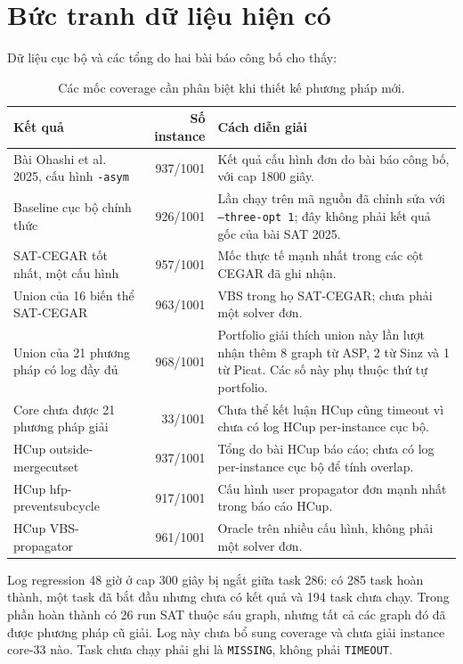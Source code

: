 \documentclass[11pt,a4paper,oneside]{scrreprt}
\newcommand{\code}[1]{\texttt{#1}}
\begin{document}
\section{Bức tranh dữ liệu hiện có}

Dữ liệu cục bộ và các tổng do hai bài báo công bố cho thấy:

\begin{table}[H]
\centering
\begin{tabularx}{\textwidth}{X r X}
\toprule
Kết quả & Số instance & Cách diễn giải \\
\midrule
Bài Ohashi et al. 2025, cấu hình \code{-asym} & 937/1001 & Kết quả cấu hình đơn do bài báo công bố, với cap 1800 giây. \\
Baseline cục bộ chính thức & 926/1001 & Lần chạy trên mã nguồn đã chỉnh sửa với \code{--three-opt 1}; đây không phải kết quả gốc của bài SAT 2025. \\
SAT-CEGAR tốt nhất, một cấu hình & 957/1001 & Mốc thực tế mạnh nhất trong các cột CEGAR đã ghi nhận. \\
Union của 16 biến thể SAT-CEGAR & 963/1001 & VBS trong họ SAT-CEGAR; chưa phải một solver đơn. \\
Union của 21 phương pháp có log đầy đủ & 968/1001 & Portfolio giải thích union này lần lượt nhận thêm 8 graph từ ASP, 2 từ Sinz và 1 từ Picat. Các số này phụ thuộc thứ tự portfolio. \\
Core chưa được 21 phương pháp giải & 33/1001 & Chưa thể kết luận HCup cũng timeout vì chưa có log HCup per-instance cục bộ. \\
HCup outside-mergecutset & 937/1001 & Tổng do bài HCup báo cáo; chưa có log per-instance cục bộ để tính overlap. \\
HCup hfp-preventsubcycle & 917/1001 & Cấu hình user propagator đơn mạnh nhất trong báo cáo HCup. \\
HCup VBS-propagator & 961/1001 & Oracle trên nhiều cấu hình, không phải một solver đơn. \\
\bottomrule
\end{tabularx}
\caption{Các mốc coverage cần phân biệt khi thiết kế phương pháp mới.}
\end{table}

Log regression 48 giờ ở cap 300 giây bị ngắt giữa task 286: có 285 task hoàn thành, một task đã bắt đầu nhưng chưa có kết quả và 194 task chưa chạy. Trong phần hoàn thành có 26 run SAT thuộc sáu graph, nhưng tất cả các graph đó đã được phương pháp cũ giải. Log này chưa bổ sung coverage và chưa giải instance core-33 nào. Task chưa chạy phải ghi là \code{MISSING}, không phải \code{TIMEOUT}.
\end{document}

